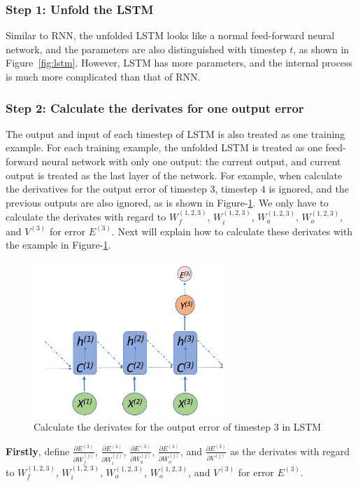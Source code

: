 \documentclass{article}
\begin{document}
\subsubsection{Step 1: Unfold the LSTM}
Similar to RNN, the unfolded LSTM looks like a normal feed-forward neural network, and the parameters are also distinguished with timestep $t$, as shown in Figure~\ref{fig:lstm}. 
However, LSTM has more parameters, and the internal process is much more complicated than that of RNN.

\subsubsection{Step 2: Calculate the derivates for one output error}
The output and input of each timestep of LSTM is also treated as one training example. For each training example, the unfolded LSTM is treated as one feed-forward neural network with only one output: the current output, and current output is treated as the last layer of the network.  
For example, when calculate the derivatives for the output error of timestep $3$, timestep $4$  is ignored, and the previous outputs are also ignored, as is shown in Figure-\ref{fig:lstm-one}. We only have to calculate the derivates with regard to $W^{(1,2,3)}_f$, $W^{(1,2,3)}_i$, $W^{(1,2,3)}_a$, $W^{(1,2,3)}_o$, and $V^{(3)}$ for error $E^{(3)}$. Next will explain how to calculate these derivates with the example in Figure-\ref{fig:lstm-one}.

\begin{figure}[htbp]
	\centering
	\includegraphics[width=0.65\textwidth, keepaspectratio]{lstm-one}
	\caption{Calculate the derivates for the output error of timestep 3 in LSTM}
	\label{fig:lstm-one}
\end{figure}


\textbf{Firstly}, define $\frac{\partial E^{(3)}}{\partial W^{(j)}_f}$,  $\frac{\partial E^{(3)}}{\partial W^{(j)}_i}$, $\frac{\partial E^{(3)}}{\partial W^{(j)}_a}$,  $\frac{\partial E^{(3)}}{\partial W^{(j)}_o}$, and $\frac{\partial E^{(3)}}{\partial V^{(j)}}$ as the derivates with regard to $W^{(1,2,3)}_f$, $W^{(1,2,3)}_i$, $W^{(1,2,3)}_a$, $W^{(1,2,3)}_o$, and $V^{(3)}$  for error $E^{(3)}$.
\end{document}
